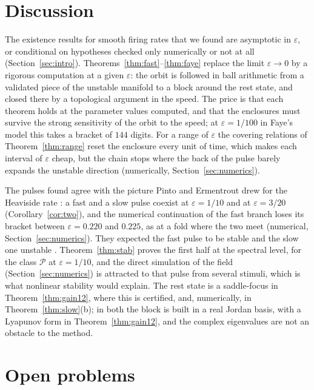 \documentclass[11pt]{article}
\theoremstyle{definition}
\newcommand{\eps}{\varepsilon}
\newcommand{\Pcl}{\mathcal{P}}
\begin{document}
\section{Discussion}\label{sec:discussion}

The existence results for smooth firing rates that we found are asymptotic in $\eps$, or conditional on hypotheses checked only numerically or not at all (Section~\ref{sec:intro}). Theorems~\ref{thm:fast}--\ref{thm:faye} replace the limit $\eps \to 0$ by a rigorous computation at a given $\eps$: the orbit is followed in ball arithmetic from a validated piece of the unstable manifold to a block around the rest state, and closed there by a topological argument in the speed. The price is that each theorem holds at the parameter values computed, and that the enclosures must survive the strong sensitivity of the orbit to the speed; at $\eps = 1/100$ in Faye's model this takes a bracket of $144$ digits. For a range of $\eps$ the covering relations of Theorem~\ref{thm:range} reset the enclosure every unit of time, which makes each interval of $\eps$ cheap, but the chain stops where the back of the pulse barely expands the unstable direction (numerically, Section~\ref{sec:numerics}).

The pulses found agree with the picture Pinto and Ermentrout drew for the Heaviside rate \cite[Sect.~3.1]{pe2001}: a fast and a slow pulse coexist at $\eps = 1/10$ and at $\eps = 3/20$ (Corollary~\ref{cor:two}), and the numerical continuation of the fast branch loses its bracket between $\eps = 0.220$ and $0.225$, as at a fold where the two meet (numerical, Section~\ref{sec:numerics}). They expected the fast pulse to be stable and the slow one unstable \cite[Sect.~3.1]{pe2001}. Theorem~\ref{thm:stab} proves the first half at the spectral level, for the class $\Pcl$ at $\eps = 1/10$, and the direct simulation of the field (Section~\ref{sec:numerics}) is attracted to that pulse from several stimuli, which is what nonlinear stability would explain. The rest state is a saddle-focus in Theorem~\ref{thm:gain12}, where this is certified, and, numerically, in Theorem~\ref{thm:slow}(b); in both the block is built in a real Jordan basis, with a Lyapunov form in Theorem~\ref{thm:gain12}, and the complex eigenvalues are not an obstacle to the method.

\section{Open problems}\label{sec:open}
\end{document}
